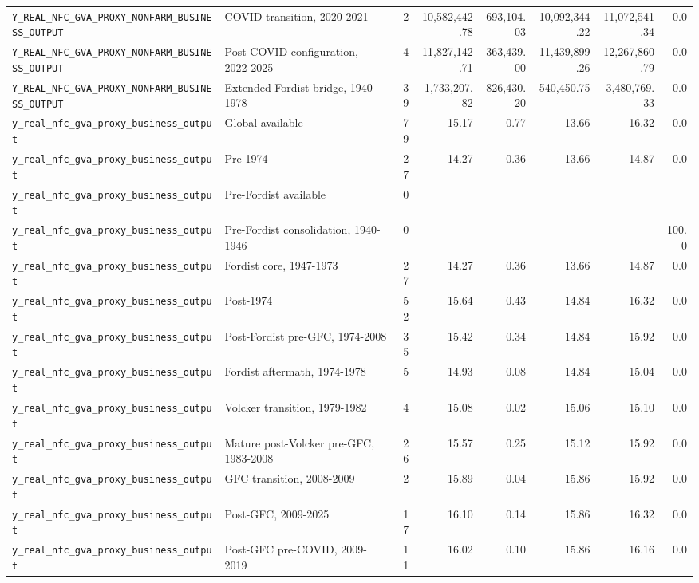 \begin{landscape}
\begin{longtable}{p{4.4cm}p{3.8cm}rrrrrr}
\\
\nolinkurl{Y_REAL_NFC_GVA_PROXY_NONFARM_BUSINESS_OUTPUT} & COVID transition, 2020-2021 & 2 & 10,582,442.78 & 693,104.03 & 10,092,344.22 & 11,072,541.34 & 0.0
\\
\nolinkurl{Y_REAL_NFC_GVA_PROXY_NONFARM_BUSINESS_OUTPUT} & Post-COVID configuration, 2022-2025 & 4 & 11,827,142.71 & 363,439.00 & 11,439,899.26 & 12,267,860.79 & 0.0
\\
\nolinkurl{Y_REAL_NFC_GVA_PROXY_NONFARM_BUSINESS_OUTPUT} & Extended Fordist bridge, 1940-1978 & 39 & 1,733,207.82 & 826,430.20 & 540,450.75 & 3,480,769.33 & 0.0
\\
\nolinkurl{y_real_nfc_gva_proxy_business_output} & Global available & 79 & 15.17 & 0.77 & 13.66 & 16.32 & 0.0
\\
\nolinkurl{y_real_nfc_gva_proxy_business_output} & Pre-1974 & 27 & 14.27 & 0.36 & 13.66 & 14.87 & 0.0
\\
\nolinkurl{y_real_nfc_gva_proxy_business_output} & Pre-Fordist available & 0 &  &  &  &  &
\\
\nolinkurl{y_real_nfc_gva_proxy_business_output} & Pre-Fordist consolidation, 1940-1946 & 0 &  &  &  &  & 100.0
\\
\nolinkurl{y_real_nfc_gva_proxy_business_output} & Fordist core, 1947-1973 & 27 & 14.27 & 0.36 & 13.66 & 14.87 & 0.0
\\
\nolinkurl{y_real_nfc_gva_proxy_business_output} & Post-1974 & 52 & 15.64 & 0.43 & 14.84 & 16.32 & 0.0
\\
\nolinkurl{y_real_nfc_gva_proxy_business_output} & Post-Fordist pre-GFC, 1974-2008 & 35 & 15.42 & 0.34 & 14.84 & 15.92 & 0.0
\\
\nolinkurl{y_real_nfc_gva_proxy_business_output} & Fordist aftermath, 1974-1978 & 5 & 14.93 & 0.08 & 14.84 & 15.04 & 0.0
\\
\nolinkurl{y_real_nfc_gva_proxy_business_output} & Volcker transition, 1979-1982 & 4 & 15.08 & 0.02 & 15.06 & 15.10 & 0.0
\\
\nolinkurl{y_real_nfc_gva_proxy_business_output} & Mature post-Volcker pre-GFC, 1983-2008 & 26 & 15.57 & 0.25 & 15.12 & 15.92 & 0.0
\\
\nolinkurl{y_real_nfc_gva_proxy_business_output} & GFC transition, 2008-2009 & 2 & 15.89 & 0.04 & 15.86 & 15.92 & 0.0
\\
\nolinkurl{y_real_nfc_gva_proxy_business_output} & Post-GFC, 2009-2025 & 17 & 16.10 & 0.14 & 15.86 & 16.32 & 0.0
\\
\nolinkurl{y_real_nfc_gva_proxy_business_output} & Post-GFC pre-COVID, 2009-2019 & 11 & 16.02 & 0.10 & 15.86 & 16.16 & 0.0

\end{longtable}
\end{landscape}
